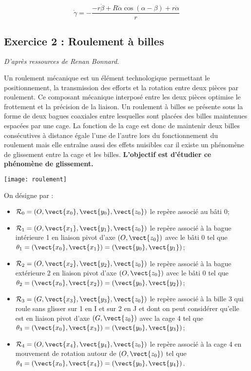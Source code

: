 \ifprof
\begin{corrige}

$$
 \dot{\gamma}=-\dfrac{-r\dot{\beta}+ R\dot{\alpha}\cos(\alpha-\beta) + r\dot{\alpha}}{r}
$$
\end{corrige}
\else
\fi




\setcounter{subparagraph}{0}
\subsection*{Exercice 2 : Roulement à billes}
\begin{flushleft}
\textit{D'après ressources de Renan Bonnard.}
\end{flushleft}

Un roulement mécanique est un élément technologique permettant le positionnement, la transmission des efforts et la rotation entre deux pièces par roulement. Ce composant mécanique interposé entre les deux pièces optimise le frottement et la précision de la liaison. Un roulement à billes se présente sous la forme de deux bagues coaxiales entre lesquelles sont placées des billes maintenues espacées par une cage. La fonction de la cage est donc de maintenir deux billes consécutives à distance égale l'une de l'autre lors du fonctionnement du roulement mais elle entraîne aussi des effets nuisibles car il existe un phénomène de glissement entre la cage et les billes. \textbf {L'objectif est d'étudier ce phénomène de glissement.}

\begin{center}
 \texttt{[image: roulement]}
\end{center}

On désigne par :
\begin{itemize}
\item $\mathcal{R}_0 = \left(O,\vect{x_0},\vect{y_0},\vect{z_0}\right)$ le repère associé au bâti 0;
\item $\mathcal{R}_1 = \left(O,\vect{x_1},\vect{y_1},\vect{z_0}\right)$ le repère associé à la bague intérieure 1 en liaison pivot d'axe $(O,\vect{z_0})$ avec le bâti 0 tel que $\theta_1 = \left(\vect{x_0},\vect{x_1}\right) = \left(\vect{y_0},\vect{y_1}\right)$;
\item $\mathcal{R}_2 = \left(O,\vect{x_2},\vect{y_2},\vect{z_0}\right)$ le repère associé à la bague extérieure 2 en liaison pivot d'axe $(O,\vect{z_0})$ avec le bâti 0 tel que $\theta_2 = \left(\vect{x_0},\vect{x_2}\right) = \left(\vect{y_0},\vect{y_2}\right)$;
\item $\mathcal{R}_3 = \left(G,\vect{x_3},\vect{y_3},\vect{z_0}\right)$ le repère associé à la bille 3 qui roule sans glisser sur 1 en I et sur 2 en J et dont on peut considérer qu'elle est en liaison pivot d'axe $(G,\vect{z_0})$ avec la cage 4 tel que $\theta_3 = \left(\vect{x_0},\vect{x_3}\right) = \left(\vect{y_0},\vect{y_3}\right)$;
\item $\mathcal{R}_4 = \left(O,\vect{x_4},\vect{y_4},\vect{z_0}\right)$ le repère associé à la cage 4 en mouvement de rotation autour de $(O,\vect{z_0})$ tel que $\theta_4 = \left(\vect{x_0},\vect{x_4}\right) = \left(\vect{y_0},\vect{y_4}\right)$.
\end{itemize}

